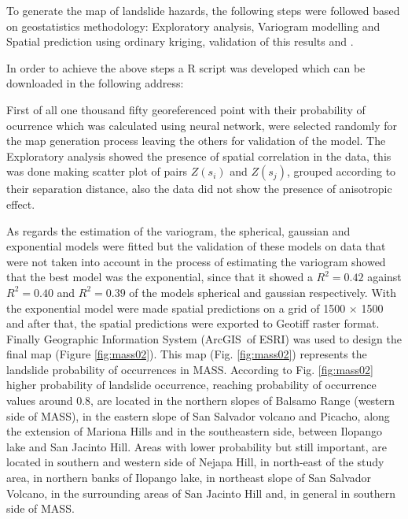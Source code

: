 \documentclass[11pt,twoside]{rmta2010esp}%
\begin{document}
To generate the map of landslide hazards, the following steps were followed based on geostatistics methodology: Exploratory analysis, Variogram modelling and Spatial prediction using ordinary kriging, validation of this results and . 

In order to achieve the above steps a R script was developed which can be downloaded in the following address:



First of all one thousand fifty georeferenced point with their probability of ocurrence which was calculated using neural network, were selected randomly for the map generation process leaving the others for validation of the model. The Exploratory analysis showed the presence of spatial correlation in the data, this was done making scatter plot of pairs $Z(s_{i})$ and  $Z(s_{j})$, grouped according to their separation distance, also the data did not show the presence of anisotropic effect. 

As regards the estimation of the variogram, the spherical, gaussian and exponential models were fitted but the validation of these models on data that were not taken into account in the process of estimating the variogram showed that the best model was the exponential, since that it showed a $ R^{2} = 0.42 $ against $ R^{2} = 0.40 $ and $ R^{2} = 0.39 $ of the models spherical and gaussian respectively. With the exponential model were made spatial predictions on a grid of 1500 $\times$ 1500 and after that, the spatial predictions were exported to Geotiff raster format. Finally Geographic Information System (ArcGIS\textregistered \  of ESRI) was used to design the final map (Figure \ref{fig:mass02}). This map (Fig. \ref{fig:mass02}) represents the landslide probability of occurrences in MASS. According to Fig. \ref{fig:mass02} higher probability of landslide occurrence, reaching probability of occurrence values around 0.8, are located in the northern slopes of Balsamo Range (western side of MASS), in the eastern slope of San Salvador volcano and Picacho,  along the extension of Mariona Hills  and in the southeastern side, between Ilopango lake and San Jacinto Hill. Areas with lower probability but still important, are located in southern and western side of Nejapa Hill, in north-east of the study area, in northern banks of Ilopango lake, in northeast slope of San Salvador Volcano, in the surrounding areas of San Jacinto Hill and, in general in southern side of MASS. 
\end{document}
